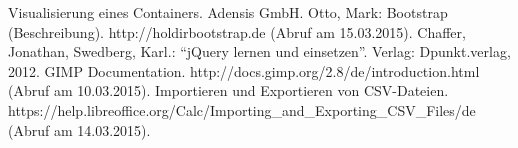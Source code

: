 \begin{thebibliography}{}
	 Visualisierung eines Containers. Adensis GmbH.
   Otto, Mark: Bootstrap (Beschreibung). http://holdirbootstrap.de (Abruf am 15.03.2015).
	 Chaffer, Jonathan,  Swedberg, Karl.:  "`jQuery lernen und einsetzen"'. Verlag: Dpunkt.verlag, 2012.
	 GIMP Documentation. http://docs.gimp.org/2.8/de/introduction.html (Abruf am 10.03.2015).
	 Importieren und Exportieren von CSV-Dateien. \\
	https://help.libreoffice.org/Calc/Importing\_and\_Exporting\_CSV\_Files/de (Abruf am 14.03.2015).
\end{thebibliography}	

